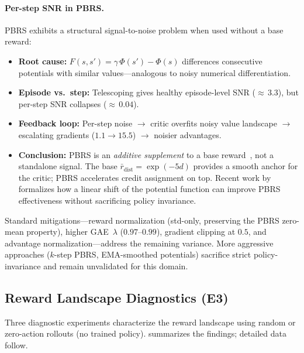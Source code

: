 \documentclass[11pt]{article}
\begin{document}
\paragraph{Per-step SNR in PBRS.}
PBRS exhibits a structural signal-to-noise problem when used without a base reward:

\begin{itemize}
  \item \textbf{Root cause:} $F(s,s') = \gamma\,\Phi(s') - \Phi(s)$ differences consecutive potentials with similar values---analogous to noisy numerical differentiation.
  \item \textbf{Episode vs.\ step:} Telescoping gives healthy episode-level SNR (${\approx}\,3.3$), but per-step SNR collapses (${\approx}\,0.04$).
  \item \textbf{Feedback loop:} Per-step noise $\to$ critic overfits noisy value landscape $\to$ escalating gradients ($1.1 \to 15.5$) $\to$ noisier advantages.
  \item \textbf{Conclusion:} PBRS is an \emph{additive supplement} to a base reward~\citep{Ng1999,Wiewiora2003}, not a standalone signal. The base $\bar{r}_{\text{dist}} = \exp(-5d)$ provides a smooth anchor for the critic; PBRS accelerates credit assignment on top. Recent work by \citet{Mueller2025} formalizes how a linear shift of the potential function can improve PBRS effectiveness without sacrificing policy invariance.
\end{itemize}

\noindent
Standard mitigations---reward normalization (std-only, preserving the PBRS zero-mean property), higher GAE~$\lambda$ ($0.97$--$0.99$), gradient clipping at $0.5$, and advantage normalization---address the remaining variance.
More aggressive approaches ($k$-step PBRS, EMA-smoothed potentials) sacrifice strict policy-invariance and remain unvalidated for this domain.

\subsection{Reward Landscape Diagnostics (E3)}
\label{sec:rl-dismech:diagnostics}

Three diagnostic experiments characterize the reward landscape using random or zero-action rollouts (no trained policy).
 summarizes the findings; detailed data follow.
\end{document}
